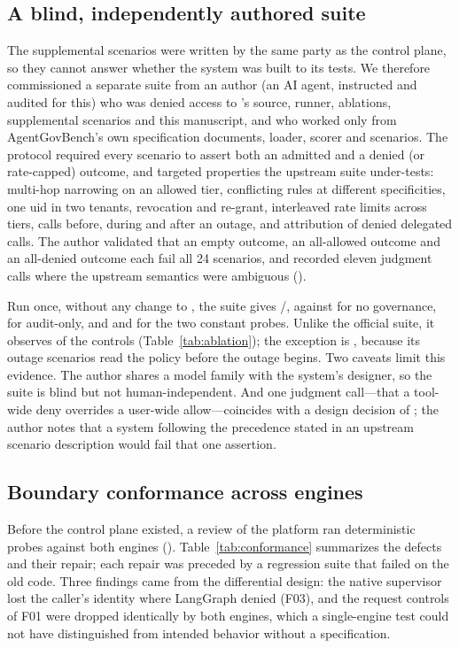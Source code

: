 \subsection{A blind, independently authored suite}
\label{sec:blind}
The supplemental scenarios were written by the same party as the control plane, so they cannot answer whether the system was built to its tests. We therefore commissioned a separate suite from an author (an AI agent, instructed and audited for this) who was denied access to \method{}'s source, runner, ablations, supplemental scenarios and this manuscript, and who worked only from AgentGovBench's own specification documents, loader, scorer and scenarios. The protocol required every scenario to assert both an admitted and a denied (or rate-capped) outcome, and targeted properties the upstream suite under-tests: multi-hop narrowing on an allowed tier, conflicting rules at different specificities, one uid in two tenants, revocation and re-grant, interleaved rate limits across tiers, calls before, during and after an outage, and attribution of denied delegated calls. The author validated that an empty outcome, an all-allowed outcome and an all-denied outcome each fail all 24 scenarios, and recorded eleven judgment calls where the upstream semantics were ambiguous ().

Run once, without any change to \method{}, the suite gives \method{} \IndepFoundry{}/\IndepTotal{}, against \IndepVanilla{} for no governance, \IndepAuditOnly{} for audit-only, and \IndepDenyAll{} and \IndepAllowAll{} for the two constant probes. Unlike the official suite, it observes \IndepObservable{} of the \AblationCount{} controls (Table~\ref{tab:ablation}); the exception is \IndepUnobservableList{}, because its outage scenarios read the policy before the outage begins. Two caveats limit this evidence. The author shares a model family with the system's designer, so the suite is blind but not human-independent. And one judgment call---that a tool-wide deny overrides a user-wide allow---coincides with a design decision of \method{}; the author notes that a system following the precedence stated in an upstream scenario description would fail that one assertion.

\subsection{Boundary conformance across engines}
\label{sec:conformance}
Before the control plane existed, a review of the platform ran deterministic probes against both engines (). Table~\ref{tab:conformance} summarizes the defects and their repair; each repair was preceded by a regression suite that failed on the old code. Three findings came from the differential design: the native supervisor lost the caller's identity where LangGraph denied (F03), and the request controls of F01 were dropped identically by both engines, which a single-engine test could not have distinguished from intended behavior without a specification.

